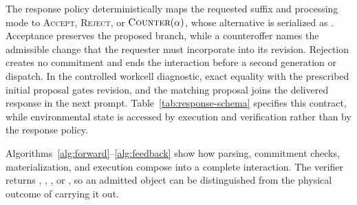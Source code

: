 \documentclass[sigconf,nonacm,balance=false]{aamas}
\begin{document}
The response policy deterministically maps the requested suffix and processing mode to \textsc{Accept}, \textsc{Reject}, or $\textsc{Counter}(\alpha)$, whose alternative is serialized as . Acceptance preserves the proposed branch, while a counteroffer names the admissible change that the requester must incorporate into its revision. Rejection creates no commitment and ends the interaction before a second generation or dispatch. In the controlled workcell diagnostic, exact equality with the prescribed initial proposal gates revision, and the matching proposal joins the delivered response in the next prompt. Table~\ref{tab:response-schema} specifies this contract, while environmental state is accessed by execution and verification rather than by the response policy.

Algorithms~\ref{alg:forward}--\ref{alg:feedback} show how parsing, commitment checks, materialization, and execution compose into a complete interaction. The verifier returns , , , or , so an admitted object can be distinguished from the physical outcome of carrying it out.
\end{document}
